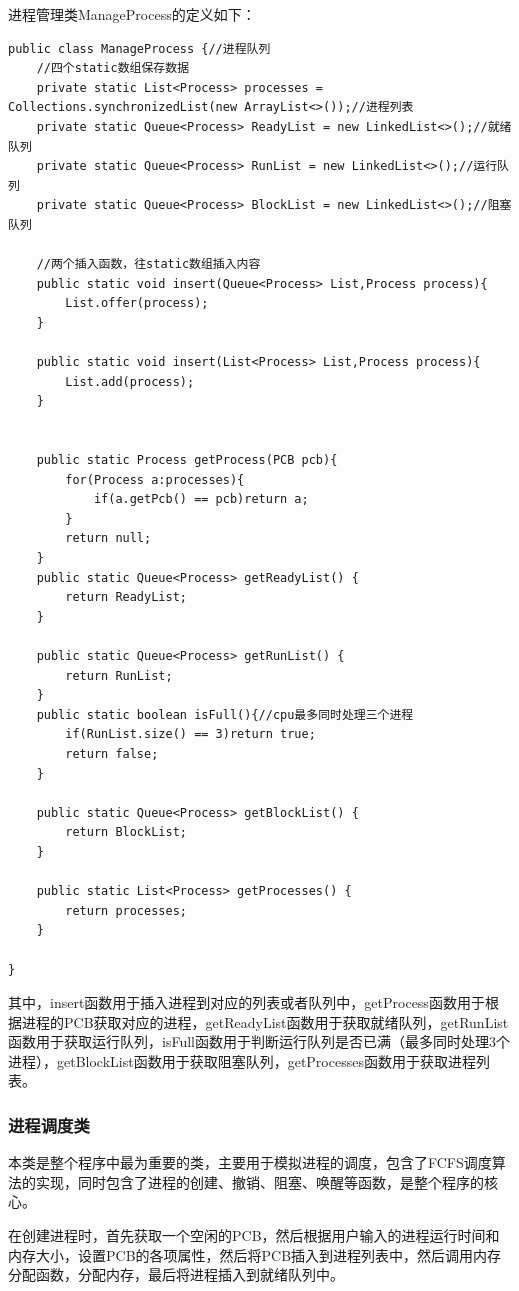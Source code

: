 \documentclass[UTF8,12pt]{article}
\begin{document}
进程管理类ManageProcess的定义如下：
\begin{lstlisting}[title=进程管理类定义,frame=shadowbox]
    public class ManageProcess {//进程队列
    //四个static数组保存数据
    private static List<Process> processes = Collections.synchronizedList(new ArrayList<>());//进程列表
    private static Queue<Process> ReadyList = new LinkedList<>();//就绪队列
    private static Queue<Process> RunList = new LinkedList<>();//运行队列
    private static Queue<Process> BlockList = new LinkedList<>();//阻塞队列

    //两个插入函数，往static数组插入内容
    public static void insert(Queue<Process> List,Process process){
        List.offer(process);
    }

    public static void insert(List<Process> List,Process process){
        List.add(process);
    }


    public static Process getProcess(PCB pcb){
        for(Process a:processes){
            if(a.getPcb() == pcb)return a;
        }
        return null;
    }
    public static Queue<Process> getReadyList() {
        return ReadyList;
    }

    public static Queue<Process> getRunList() {
        return RunList;
    }
    public static boolean isFull(){//cpu最多同时处理三个进程
        if(RunList.size() == 3)return true;
        return false;
    }

    public static Queue<Process> getBlockList() {
        return BlockList;
    }

    public static List<Process> getProcesses() {
        return processes;
    }

}
\end{lstlisting}

其中，insert函数用于插入进程到对应的列表或者队列中，getProcess函数用于根据进程的PCB获取对应的进程，getReadyList函数用于获取就绪队列，getRunList函数用于获取运行队列，isFull函数用于判断运行队列是否已满（最多同时处理3个进程），getBlockList函数用于获取阻塞队列，getProcesses函数用于获取进程列表。

\subsubsection{进程调度类}
本类是整个程序中最为重要的类，主要用于模拟进程的调度，包含了FCFS调度算法的实现，同时包含了进程的创建、撤销、阻塞、唤醒等函数，是整个程序的核心。

在创建进程时，首先获取一个空闲的PCB，然后根据用户输入的进程运行时间和内存大小，设置PCB的各项属性，然后将PCB插入到进程列表中，然后调用内存分配函数，分配内存，最后将进程插入到就绪队列中。
\end{document}
